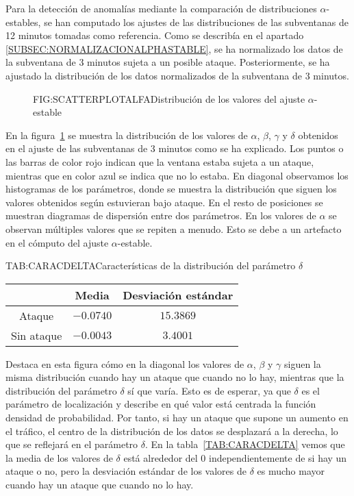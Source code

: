 Para la detección de anomalías mediante la comparación de distribuciones $\alpha$-estables, se han computado los ajustes de las distribuciones de las subventanas de 12 minutos tomadas como referencia. Como se describía en el apartado \ref{SUBSEC:NORMALIZACIONALPHASTABLE}, se ha normalizado los datos de la subventana de 3 minutos sujeta a un posible ataque.
Posteriormente, se ha ajustado la distribución de los datos normalizados de la subventana de 3 minutos.

\begin{figure}[Distribución de los valores del ajuste $\alpha$-estable]{FIG:SCATTERPLOTALFA}{Distribución de los valores del ajuste $\alpha$-estable}
    \label{FIG:SCATTERPLOTALFA}
\end{figure}

En la figura~\ref{FIG:SCATTERPLOTALFA} se muestra la distribución de los valores de $\alpha$, $\beta$, $\gamma$ y $\delta$ obtenidos en el ajuste de las subventanas de 3 minutos como se ha explicado. Los puntos o las barras de color rojo indican que la ventana estaba sujeta a un ataque, mientras que en color azul se indica que no lo estaba.
En diagonal observamos los histogramas de los parámetros, donde se muestra la distribución que siguen los valores obtenidos según estuvieran bajo ataque. En el resto de posiciones se muestran diagramas de dispersión entre dos parámetros. En los valores de $\alpha$ se observan múltiples valores que se repiten a menudo. Esto se debe a un artefacto en el cómputo del ajuste $\alpha$-estable.

\begin{table}[Características de la distribución del parámtero $\delta$]{TAB:CARACDELTA}{Características de la distribución del parámetro $\delta$}
    \begin{tabular}{|c|c|c|}
        \hline
        & Media & Desviación estándar \\
        \hline
        Ataque & $-0.0740$ & $15.3869$ \\
        Sin ataque & $-0.0043$ & $3.4001$ \\
        \hline
    \end{tabular}
\end{table}

Destaca en esta figura cómo en la diagonal los valores de $\alpha$, $\beta$ y $\gamma$ siguen la misma distribución cuando hay un ataque que cuando no lo hay, mientras que la distribución del parámetro $\delta$ sí que varía. Esto es de esperar, ya que $\delta$ es el parámetro de localización y describe en qué valor está centrada la función
densidad de probabilidad. Por tanto, si hay un ataque que supone un aumento en el tráfico, el centro de la distribución de los datos se desplazará a la derecha, lo que se reflejará en el parámetro $\delta$. En la tabla~\ref{TAB:CARACDELTA} vemos que la media de los valores de $\delta$ está alrededor del $0$ independientemente de si hay un ataque o no, pero la desviación estándar de los valores de $\delta$ es mucho mayor cuando hay un ataque que cuando no lo hay. 

